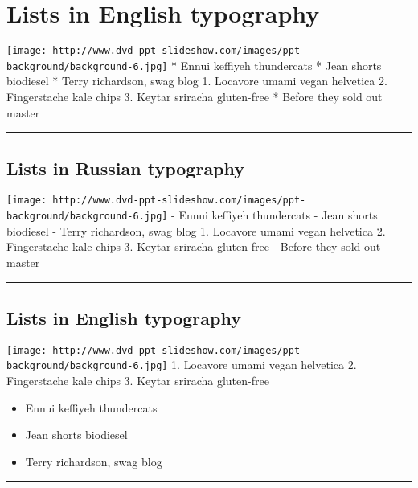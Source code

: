 \documentclass[]{article}
\begin{document}
\section{Lists in English typography}\label{lists-in-english-typography}

\texttt{[image: http://www.dvd-ppt-slideshow.com/images/ppt-background/background-6.jpg]}
* Ennui keffiyeh thundercats * Jean shorts biodiesel * Terry richardson,
swag blog 1. Locavore umami vegan helvetica 2. Fingerstache kale chips
3. Keytar sriracha gluten-free * Before they sold out master

\begin{center}\rule{3in}{0.4pt}\end{center}

\subsection{Lists in Russian
typography}\label{lists-in-russian-typography}

\texttt{[image: http://www.dvd-ppt-slideshow.com/images/ppt-background/background-6.jpg]}
- Ennui keffiyeh thundercats - Jean shorts biodiesel - Terry richardson,
swag blog 1. Locavore umami vegan helvetica 2. Fingerstache kale chips
3. Keytar sriracha gluten-free - Before they sold out master

\begin{center}\rule{3in}{0.4pt}\end{center}

\subsection{Lists in English
typography}\label{lists-in-english-typography-1}

\texttt{[image: http://www.dvd-ppt-slideshow.com/images/ppt-background/background-6.jpg]}
1. Locavore umami vegan helvetica 2. Fingerstache kale chips 3. Keytar
sriracha gluten-free

\begin{itemize}
\itemsep1pt\parskip0pt
\item
  Ennui keffiyeh thundercats
\item
  Jean shorts biodiesel
\item
  Terry richardson, swag blog
\end{itemize}

\begin{center}\rule{3in}{0.4pt}\end{center}
\end{document}
